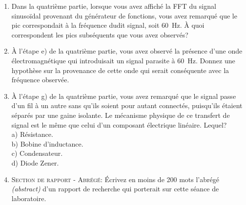 \documentclass[canadien,12pt,oneside,letterpaper]{article}
\begin{document}
\begin{enumerate}
\begin{enumerate}
        \noindent{}
    \end{enumerate}
    \item Dans la quatrième partie, lorsque vous avez affiché la FFT du signal sinusoïdal provenant du générateur de fonctions, vous avez remarqué que le pic correspondait à la fréquence dudit signal, soit 60~Hz. À quoi correspondent les pics subséquents que vous avez observés?
    \item À l'étape e) de la quatrième partie, vous avez observé la présence d'une onde électromagnétique qui introduisait un signal parasite à 60~Hz. Donnez une hypothèse sur la provenance de cette onde qui serait conséquente avec la fréquence observée.
    \item À l'étape g) de la quatrième partie, vous avez remarqué que le signal passe d'un fil à un autre sans qu'ils soient pour autant connectés, puisqu'ils étaient séparés par une gaine isolante. Le mécanisme physique de ce transfert de signal est le même que celui d'un composant électrique linéaire. Lequel?\\a) Résistance.\\b) Bobine d'inductance.\\c) Condensateur.\\d) Diode Zener.
    \item \textsc{Section de rapport - Abrégé:} Écrivez en moins de 200 mots l'abrégé \textit{(abstract)} d'un rapport de recherche qui porterait sur cette séance de laboratoire.
\end{enumerate}
\end{document}

